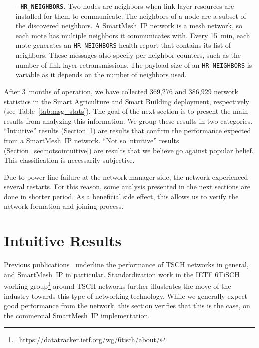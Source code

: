 \documentclass{elsarticle}
\newcommand{\smip}                {SmartMesh~IP\xspace}
\newcommand{\building}            {Smart Building\xspace}
\newcommand{\agri}                {Smart Agriculture\xspace}
\newcommand{\HRNEIGHBORS}         {{\tt HR\_NEIGHBORS}\xspace}
\newcommand{\HRDISCOVERED}        {{\tt HR\_DISCOVERED}\xspace}
\newcommand{\PEACHNUMSTATS}       {369,276\xspace}
\newcommand{\EVANUMSTATS}         {386,929\xspace}
\begin{document}
\begin{itemize}
        These discovered neighbors can potentially be used in the future as neighbors the node communicates with.
        The payload size of an \HRDISCOVERED is variable as it depends on the number of neighbors heard.
    \item[-] \textbf{\HRNEIGHBORS.}
        Two nodes are neighbors when link-layer resources are installed for them to communicate.
        The neighbors of a node are a subset of the discovered neighbors.
        A \smip network is a mesh network, so each mote has multiple neighbors it communicates with.
        Every 15~min, each mote generates an \HRNEIGHBORS health report that contains its list of neighbors.
        These messages also specify per-neighbor counters, such as the number of link-layer retransmissions.
        The payload size of an \HRNEIGHBORS is variable as it depends on the number of neighbors used.
\end{itemize}


After 3~months of operation, we have collected \PEACHNUMSTATS and \EVANUMSTATS network statistics in the \agri and \building deployment, respectively (see Table~\ref{tab:msg_stats}).
The goal of the next section is to present the main results from analyzing this information.
We group these results in two categories.
``Intuitive'' results (Section~\ref{sec:intuitive}) are results that confirm the performance expected from a \smip network.
``Not so intuitive'' results (Section~\ref{sec:notsointuitive}) are results that we believe go against popular belief.
This classification is necessarily subjective.

Due to power line failure at the network manager side, the network experienced several restarts.
For this reason, some analysis presented in the next sections are done in shorter period.
As a beneficial side effect, this allows us to verify the network formation and joining process.

\section{Intuitive Results}
\label{sec:intuitive}


Previous publications~\cite{watteyne16peach,watteyne10mitigating,watteyne09reliability,watteyne15industrial} underline the performance of TSCH networks in general, and \smip in particular.
Standardization work in the IETF 6TiSCH working group\footnote{~\url{https://datatracker.ietf.org/wg/6tisch/about/}} around TSCH networks further illustrates the move of the industry towards this type of networking technology.
While we generally expect good performance from the network, this section verifies that this is the case, on the commercial \smip implementation.
\end{document}

